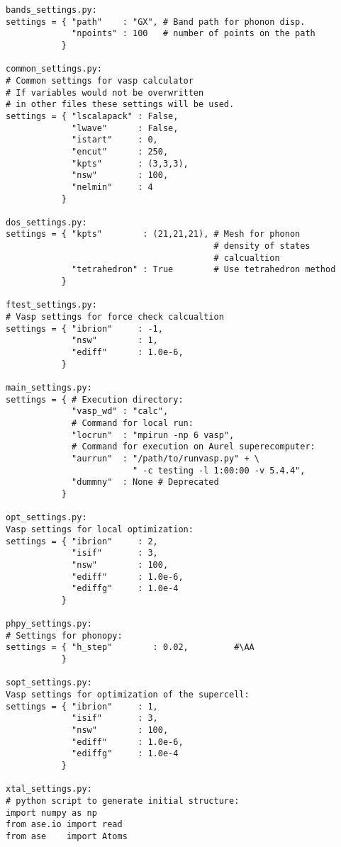 \documentclass[12pt]{article}
\begin{document}
\begin{verbatim}
bands_settings.py:
settings = { "path"    : "GX", # Band path for phonon disp.
             "npoints" : 100   # number of points on the path
           }

common_settings.py:
# Common settings for vasp calculator
# If variables would not be overwritten
# in other files these settings will be used.       
settings = { "lscalapack" : False,  
             "lwave"      : False,
             "istart"     : 0,
             "encut"      : 250,
             "kpts"       : (3,3,3),
             "nsw"        : 100,
             "nelmin"     : 4
           }
           
dos_settings.py:
settings = { "kpts"        : (21,21,21), # Mesh for phonon
                                         # density of states
                                         # calcualtion
             "tetrahedron" : True        # Use tetrahedron method
           }

ftest_settings.py:
# Vasp settings for force check calcualtion        
settings = { "ibrion"     : -1,
             "nsw"        : 1,
             "ediff"      : 1.0e-6,
           }
           
main_settings.py:
settings = { # Execution directory:
             "vasp_wd" : "calc",
             # Command for local run:
             "locrun"  : "mpirun -np 6 vasp",
             # Command for execution on Aurel superecomputer:
             "aurrun"  : "/path/to/runvasp.py" + \
                         " -c testing -l 1:00:00 -v 5.4.4",
             "dummny"  : None # Deprecated
           }
          
opt_settings.py:
Vasp settings for local optimization:
settings = { "ibrion"     : 2,
             "isif"       : 3,
             "nsw"        : 100,
             "ediff"      : 1.0e-6,
             "ediffg"     : 1.0e-4
           }
           
phpy_settings.py:
# Settings for phonopy:
settings = { "h_step"        : 0.02,         #\AA
           }

sopt_settings.py:
Vasp settings for optimization of the supercell:
settings = { "ibrion"     : 1,
             "isif"       : 3,
             "nsw"        : 100,
             "ediff"      : 1.0e-6,
             "ediffg"     : 1.0e-4
           }
           
xtal_settings.py:
# python script to generate initial structure:
import numpy as np
from ase.io import read
from ase    import Atoms


\end{verbatim}
\end{document}
